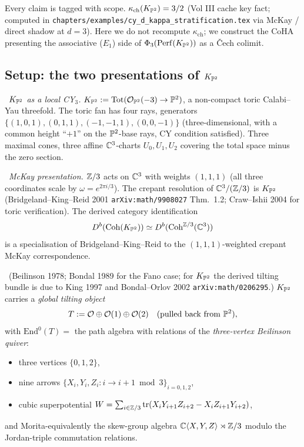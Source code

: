 Every claim is tagged with scope. $\kappa_{\mathrm{ch}}(K_{\mathbb{P}^2})=3/2$
(Vol III cache key fact; computed in \texttt{chapters/examples/cy\_d\_kappa\_stratification.tex}
via McKay / direct shadow at $d=3$). Here we do not recompute
$\kappa_{\mathrm{ch}}$; we construct the CoHA presenting the associative
($E_1$) side of $\Phi_3(\mathrm{Perf}(K_{\mathbb{P}^2}))$ as a \v Cech colimit.

\subsection*{Setup: the two presentations of $K_{\mathbb{P}^2}$}

\ClaimStatusDefinition\ \emph{$K_{\mathbb{P}^2}$ as a local CY$_3$.}
$K_{\mathbb{P}^2}:=\mathrm{Tot}(\mathcal{O}_{\mathbb{P}^2}(-3)\to\mathbb{P}^2)$, a non-compact toric
Calabi--Yau threefold. The toric fan has four rays, generators
$\{(1,0,1),(0,1,1),(-1,-1,1),(0,0,-1)\}$ (three-dimensional, with a
common height ``$+1$'' on the $\mathbb{P}^2$-base rays, CY condition
satisfied). Three maximal cones, three affine $\mathbb{C}^3$-charts
$U_0,U_1,U_2$ covering the total space minus the zero section.

\ClaimStatusDefinition\ \emph{McKay presentation.}
$\mathbb{Z}/3$ acts on $\mathbb{C}^3$ with weights $(1,1,1)$ (all three coordinates
scale by $\omega=e^{2\pi i/3}$). The crepant resolution of $\mathbb{C}^3/(\mathbb{Z}/3)$
is $K_{\mathbb{P}^2}$ (Bridgeland--King--Reid 2001 \texttt{arXiv:math/9908027}
Thm.\ 1.2; Craw--Ishii 2004 for toric verification). The derived category
identification
\[
D^b(\mathrm{Coh}(K_{\mathbb{P}^2}))\simeq D^b(\mathrm{Coh}^{\mathbb{Z}/3}(\mathbb{C}^3))
\]
is a specialisation of Bridgeland--King--Reid to the $(1,1,1)$-weighted
crepant McKay correspondence.

\ClaimStatusTheorem\ (Beilinson 1978; Bondal 1989 for the Fano case; for
$K_{\mathbb{P}^2}$ the derived tilting bundle is due to King 1997 and
Bondal--Orlov 2002 \texttt{arXiv:math/0206295}.)
$K_{\mathbb{P}^2}$ carries a \emph{global tilting object}
\[
T:=\mathcal{O}\oplus\mathcal{O}(1)\oplus\mathcal{O}(2)\quad(\text{pulled back from }\mathbb{P}^2),
\]
with
$\mathrm{End}^0(T)=$ the path algebra with relations of the
\emph{three-vertex Beilinson quiver}:
\begin{itemize}
\item three vertices $\{0,1,2\}$,
\item nine arrows $\{X_i,Y_i,Z_i:i\to i+1\bmod 3\}_{i=0,1,2}$,
\item cubic superpotential
$W=\sum_{i\in\mathbb{Z}/3}\mathrm{tr}(X_iY_{i+1}Z_{i+2}-X_iZ_{i+1}Y_{i+2})$,
\end{itemize}
and Morita-equivalently the skew-group algebra
$\mathbb{C}\langle X,Y,Z\rangle\rtimes\mathbb{Z}/3$ modulo the Jordan-triple commutation
relations.

